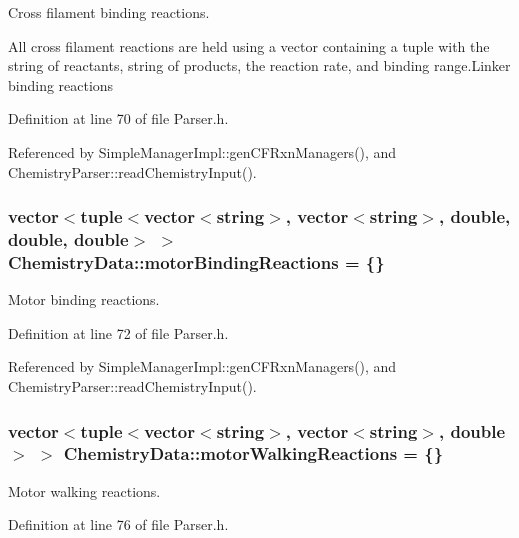 Cross filament binding reactions. 

All cross filament reactions are held using a vector containing a tuple with the string of reactants, string of products, the reaction rate, and binding range.\+Linker binding reactions 

Definition at line 70 of file Parser.\+h.



Referenced by Simple\+Manager\+Impl\+::gen\+C\+F\+Rxn\+Managers(), and Chemistry\+Parser\+::read\+Chemistry\+Input().

\hypertarget{structChemistryData_a2a4b2e949b6e0b8f32158cf101d24fa6}{
\subsubsection[{motor\+Binding\+Reactions}]{\setlength{\rightskip}{0pt plus 5cm}vector$<$tuple$<$vector$<$string$>$, vector$<$string$>$, double, double, double$>$ $>$ Chemistry\+Data\+::motor\+Binding\+Reactions = \{\}}}\label{structChemistryData_a2a4b2e949b6e0b8f32158cf101d24fa6}


Motor binding reactions. 



Definition at line 72 of file Parser.\+h.



Referenced by Simple\+Manager\+Impl\+::gen\+C\+F\+Rxn\+Managers(), and Chemistry\+Parser\+::read\+Chemistry\+Input().

\hypertarget{structChemistryData_a96d5d5289ae3651ab139b1de586b80e7}{
\subsubsection[{motor\+Walking\+Reactions}]{\setlength{\rightskip}{0pt plus 5cm}vector$<$tuple$<$vector$<$string$>$, vector$<$string$>$, double$>$ $>$ Chemistry\+Data\+::motor\+Walking\+Reactions = \{\}}}\label{structChemistryData_a96d5d5289ae3651ab139b1de586b80e7}


Motor walking reactions. 



Definition at line 76 of file Parser.\+h.



